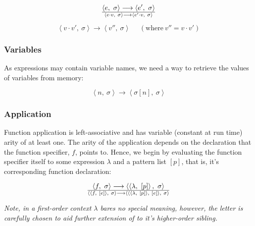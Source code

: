 \begin{equation}
{
\left\langle e,\ \sigma\right\rangle
\longrightarrow
\left\langle e',\ \sigma\right\rangle
}\over {
\left\langle e\cdot v,\ \sigma\right\rangle
\longrightarrow
\left\langle e' \cdot v,\ \sigma\right\rangle
}
\end{equation}

\begin{equation}
\left\langle v \cdot v',\ \sigma\right\rangle
\longrightarrow
\left\langle v'',\ \sigma\right\rangle
\ \ \ \ \ \ (\text{where}\ v'' = v \cdot v')
\end{equation}

\subsubsection{Variables}

As expressions may contain variable names, we need a way to retrieve the values
of variables from memory:

\begin{equation}
\left\langle n,\ \sigma\right\rangle
\longrightarrow
\left\langle \sigma[n],\ \sigma\right\rangle
\end{equation}

\subsubsection{Application}

Function application is left-associative and has variable (constant at run
time) arity of at least one. The arity of the application depends on the
declaration that the function specifier, $f$, points to. Hence, we begin by
evaluating the function specifier itself to some expression $\lambda$ and a
pattern list $[p]$, that is, it's corresponding function declaration:

\begin{equation}
{
\left\langle f,\ \sigma\right\rangle
\longrightarrow
\left\langle \left\langle \lambda,\ [p]\right\rangle,\ \sigma\right\rangle
}\over{
\left\langle \left\langle f,\ [e]\right\rangle,\ \sigma\right\rangle
\longrightarrow
\left\langle
\left\langle\left\langle \lambda,\ [p]\right\rangle,\ [e]\right\rangle
,\ \sigma\right\rangle
}
\end{equation}

\emph{Note, in a first-order context $\lambda$ bares no special meaning,
however, the letter is carefully chosen to aid further extension of  to
it's higher-order sibling.}

